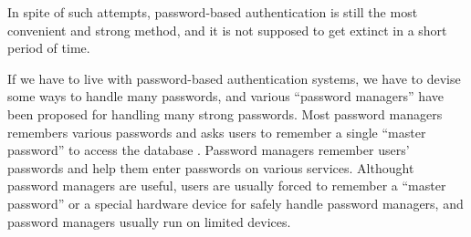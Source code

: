 \documentclass{article}
\begin{document}

In spite of such attempts,
password-based authentication is still the most
convenient and strong method\cite{Bonneau},
and it is not supposed to get extinct
in a short period of time\cite{Herley:2009:PSS:1601990.1602010}.



If we have to live with password-based authentication systems,
we have to devise some ways to handle many passwords, and
various ``password managers'' have been proposed
for handling many strong passwords.
%
%
Most password managers remembers various passwords and
asks users to remember a single ``master password'' to access the database
\cite{OnePassword}%
\cite{Dashlane}%
\cite{ミルパス}%
\cite{LastPass}%
\cite{KeyPass}%
\cite{NortonIDSafe}%
\cite{IDManager}.
%
%
Password managers remember users' passwords and help them enter
passwords on various services.
Althought password managers are useful,
users are usually forced to remember a ``master password''
or a special hardware device
for safely handle password managers, and
password managers usually run on limited devices.

%
\end{document}
